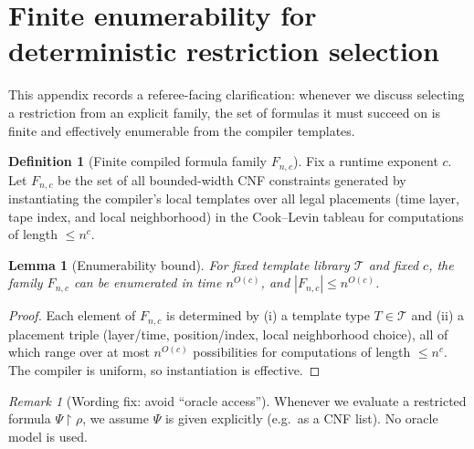 \documentclass[12pt]{article}
\newtheorem{lemma}[theorem]{Lemma}
\theoremstyle{definition}
\newtheorem{definition}{Definition}
\theoremstyle{definition}
\theoremstyle{remark}
\newtheorem{remark}{Remark}
\theoremstyle{remark}
\begin{document}

\section{Finite enumerability for deterministic restriction selection}
\label{app:finite-enumerability}

This appendix records a referee-facing clarification: whenever we discuss selecting
a restriction from an explicit family, the set of formulas it must succeed on is
finite and effectively enumerable from the compiler templates.

\begin{definition}[Finite compiled formula family $F_{n,c}$]
\label{def:finite-family}
Fix a runtime exponent $c$. Let $F_{n,c}$ be the set of all bounded-width CNF
constraints generated by instantiating the compiler's local templates over all
legal placements (time layer, tape index, and local neighborhood) in the
Cook--Levin tableau for computations of length $\le n^{c}$.
\end{definition}

\begin{lemma}[Enumerability bound]
\label{lem:enumerability}
For fixed template library $\mathcal{T}$ and fixed $c$, the family $F_{n,c}$ can be
enumerated in time $n^{O(c)}$, and $|F_{n,c}| \le n^{O(c)}$.
\end{lemma}

\begin{proof}
Each element of $F_{n,c}$ is determined by (i) a template type $T\in\mathcal{T}$ and
(ii) a placement triple (layer/time, position/index, local neighborhood choice),
all of which range over at most $n^{O(c)}$ possibilities for computations of length
$\le n^{c}$. The compiler is uniform, so instantiation is effective.
\end{proof}

\begin{remark}[Wording fix: avoid ``oracle access'']
Whenever we evaluate a restricted formula $\Psi\!\upharpoonright\!\rho$, we assume
$\Psi$ is given explicitly (e.g.\ as a CNF list). No oracle model is used.
\end{remark}
\end{document}
